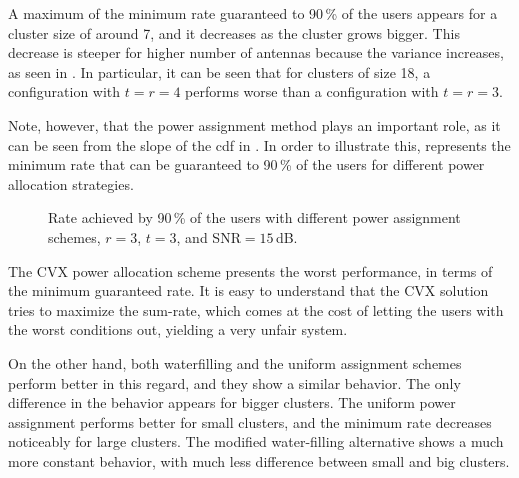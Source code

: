 A maximum of the minimum rate guaranteed to 90\,\% of the users appears for a
cluster size of around 7, and it decreases as the cluster grows bigger. This
decrease is steeper for higher number of antennas because the variance
increases, as seen in . In particular, it can be seen
that for clusters of size 18, a configuration with $t=r=4$ performs worse than a
configuration with $t=r=3$.

Note, however, that the power assignment method plays an important role, as it
can be seen from the slope of the \gls{cdf} in . In
order to illustrate this,  represents the minimum
rate that can be guaranteed to 90\,\% of the users for different power
allocation strategies.

\begin{figure}[t]
    \centering
    \begin{minipage}[t]{0.7\textwidth}
        
    \end{minipage}
\caption{Rate achieved by 90\,\% of the users with different power assignment
schemes, $r=3$, $t=3$, and SNR$=15$\,dB.}
\label{fig:min_rate_power_alloc}
\end{figure}

The CVX power allocation scheme presents the worst performance, in terms of
the minimum guaranteed rate. It is easy to understand that the CVX solution
tries to maximize the sum-rate, which comes at the cost of letting the users
with the worst conditions out, yielding a very unfair system.

On the other hand, both waterfilling and the uniform assignment schemes perform
better in this regard, and they show a similar behavior. The only difference in
the behavior appears for bigger clusters. The uniform power assignment performs
better for small clusters, and the minimum rate decreases noticeably for large
clusters. The modified water-filling alternative shows a much more constant
behavior, with much less difference between small and big clusters.
